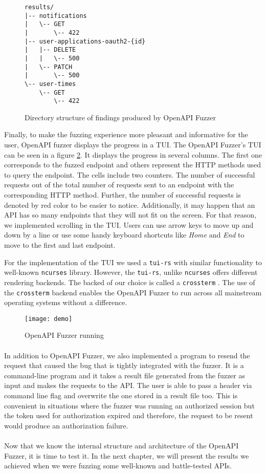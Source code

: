 \begin{figure}[h]
\begin{verbatim}
results/
|-- notifications
|   \-- GET
|       \-- 422
|-- user-applications-oauth2-{id}
|   |-- DELETE
|   |   \-- 500
|   \-- PATCH
|       \-- 500
\-- user-times
    \-- GET
        \-- 422
\end{verbatim}
\caption{Directory structure of findings produced by OpenAPI Fuzzer}
\label{fig:openapi-fuzzer-results}
\end{figure}

Finally, to make the fuzzing experience more pleasant and informative for the user, OpenAPI fuzzer displays the progress in a TUI. The OpenAPI Fuzzer's TUI can be seen in a figure \ref{fig:openapi-fuzzer-run}. It displays the progress in several columns. The first one corresponds to the fuzzed endpoint and others represent the HTTP methods used to query the endpoint. The cells include two counters. The number of successful requests out of the total number of requests sent to an endpoint with the corresponding HTTP method. Further, the number of successful requests is denoted by red color to be easier to notice. Additionally, it may happen that an API has so many endpoints that they will not fit on the screen. For that reason, we implemented scrolling in the TUI. Users can use arrow keys to move up and down by a line or use some handy keyboard shortcuts like \textit{Home} and \textit{End} to move to the first and last endpoint.

For the implementation of the TUI we used a \texttt{tui-rs} \cite{tuirs2020github} with similar functionality to well-known \texttt{ncurses} library. However, the \texttt{tui-rs}, unlike \texttt{ncurses} offers different rendering backends. The backed of our choice is called a \texttt{crossterm} \cite{crossterm2020github}. The use of the \texttt{crossterm} backend enables the OpenAPI Fuzzer to run across all mainstream operating systems without a difference.

\begin{figure}
\texttt{[image: demo]}
\caption{OpenAPI Fuzzer running}
\label{fig:openapi-fuzzer-run}
\end{figure}

\paragraph{}
In addition to OpenAPI Fuzzer, we also implemented a program to resend the request that caused the bug that is tightly integrated with the fuzzer. It is a command-line program and it takes a result file generated from the fuzzer as input and makes the requests to the API. The user is able to pass a header via command line flag and overwrite the one stored in a result file too. This is convenient in situations where the fuzzer was running an authorized session but the token used for authorization expired and therefore, the request to be resent would produce an authorization failure.

\paragraph{}
Now that we know the internal structure and architecture of the OpenAPI Fuzzer, it is time to test it. In the next chapter, we will present the results we achieved when we were fuzzing some well-known and battle-tested APIs.
